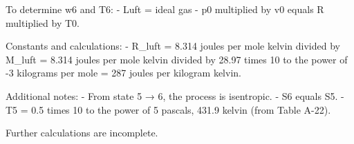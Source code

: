 To determine w6 and T6:  
- Luft = ideal gas  
- p0 multiplied by v0 equals R multiplied by T0.  

Constants and calculations:  
- R_luft = 8.314 joules per mole kelvin divided by M_luft = 8.314 joules per mole kelvin divided by 28.97 times 10 to the power of -3 kilograms per mole = 287 joules per kilogram kelvin.  

Additional notes:  
- From state 5 → 6, the process is isentropic.  
- S6 equals S5.  
- T5 = 0.5 times 10 to the power of 5 pascals, 431.9 kelvin (from Table A-22).  

Further calculations are incomplete.